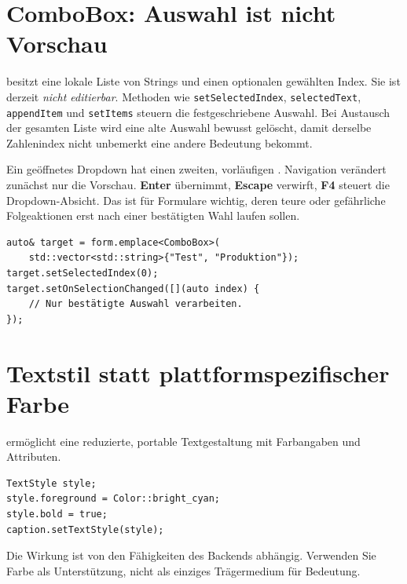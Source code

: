 \section{ComboBox: Auswahl ist nicht Vorschau}
 besitzt eine lokale Liste von Strings
und einen optionalen gewählten Index. Sie ist derzeit
\emph{nicht editierbar}. Methoden wie
\texttt{setSelectedIndex}, \texttt{selectedText},
\texttt{appendItem} und \texttt{setItems} steuern
die festgeschriebene Auswahl.
Bei Austausch der gesamten Liste wird eine alte
Auswahl bewusst gelöscht, damit derselbe Zahlenindex
nicht unbemerkt eine andere Bedeutung bekommt.

Ein geöffnetes Dropdown hat einen zweiten,
vorläufigen . Navigation verändert
zunächst nur die Vorschau. \textbf{Enter} übernimmt,
\textbf{Escape} verwirft, \textbf{F4} steuert die
Dropdown-Absicht. Das ist für Formulare wichtig,
deren teure oder gefährliche Folgeaktionen erst
nach einer bestätigten Wahl laufen sollen.
\begin{lstlisting}[language=SASDCpp]
auto& target = form.emplace<ComboBox>(
    std::vector<std::string>{"Test", "Produktion"});
target.setSelectedIndex(0);
target.setOnSelectionChanged([](auto index) {
    // Nur bestätigte Auswahl verarbeiten.
});
\end{lstlisting}

\section{Textstil statt plattformspezifischer Farbe}
 ermöglicht eine reduzierte, portable
Textgestaltung mit Farbangaben und Attributen.
\begin{lstlisting}[language=SASDCpp]
TextStyle style;
style.foreground = Color::bright_cyan;
style.bold = true;
caption.setTextStyle(style);
\end{lstlisting}
Die Wirkung ist von den Fähigkeiten des Backends
abhängig. Verwenden Sie Farbe als Unterstützung,
nicht als einziges Trägermedium für Bedeutung.
